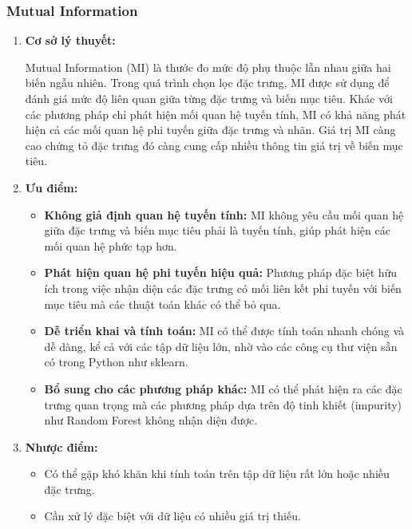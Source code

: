 \documentclass[13pt]{article}
\begin{document}
\subsubsection{Mutual Information}
\begin{enumerate}
    \item \textbf{Cơ sở lý thuyết: }

    Mutual Information (MI) là thước đo mức độ phụ thuộc lẫn nhau giữa hai biến ngẫu nhiên. Trong quá trình chọn lọc đặc trưng, MI được sử dụng để đánh giá mức độ liên quan giữa từng đặc trưng và biến mục tiêu. Khác với các phương pháp chỉ phát hiện mối quan hệ tuyến tính, MI có khả năng phát hiện cả các mối quan hệ phi tuyến giữa đặc trưng và nhãn. Giá trị MI càng cao chứng tỏ đặc trưng đó càng cung cấp nhiều thông tin giá trị về biến mục tiêu.

    \item \textbf{Ưu điểm: }
    \begin{itemize}
        \item \textbf{Không giả định quan hệ tuyến tính: } MI không yêu cầu mối quan hệ giữa đặc trưng và biến mục tiêu phải là tuyến tính, giúp phát hiện các mối quan hệ phức tạp hơn.
        \item \textbf{Phát hiện quan hệ phi tuyến hiệu quả: } Phương pháp đặc biệt hữu ích trong việc nhận diện các đặc trưng có mối liên kết phi tuyến với biến mục tiêu mà các thuật toán khác có thể bỏ qua.
        \item \textbf{Dễ triển khai và tính toán: } MI có thể được tính toán nhanh chóng và dễ dàng, kể cả với các tập dữ liệu lớn, nhờ vào các công cụ thư viện sẵn có trong Python như sklearn.
        \item \textbf{Bổ sung cho các phương pháp khác: } MI có thể phát hiện ra các đặc trưng quan trọng mà các phương pháp dựa trên độ tinh khiết (impurity) như Random Forest không nhận diện được.
    \end{itemize}
    \item \textbf{Nhược điểm: }
    \begin{itemize}
        \item Có thể gặp khó khăn khi tính toán trên tập dữ liệu rất lớn hoặc nhiều đặc trưng.
        \item Cần xử lý đặc biệt với dữ liệu có nhiều giá trị thiếu.
    \end{itemize}
\end{enumerate}
\end{document}
